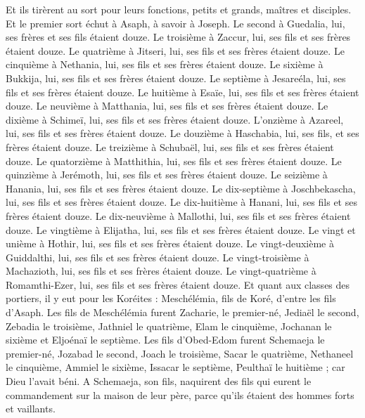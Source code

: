 \begin{multicols}{2}
Et ils tirèrent au sort pour leurs fonctions, petits et grands, maîtres et disciples.
Et le premier sort échut à Asaph, à savoir à Joseph. Le second à Guedalia, lui, ses frères et ses fils étaient douze.
Le troisième à Zaccur, lui, ses fils et ses frères étaient douze.
Le quatrième à Jitseri, lui, ses fils et ses frères étaient douze.
Le cinquième à Nethania, lui, ses fils et ses frères étaient douze.
Le sixième à Bukkija, lui, ses fils et ses frères étaient douze.
Le septième à Jesareéla, lui, ses fils et ses frères étaient douze.
Le huitième à Esaïe, lui, ses fils et ses frères étaient douze.
Le neuvième à Matthania, lui, ses fils et ses frères étaient douze.
Le dixième à Schimeï, lui, ses fils et ses frères étaient douze.
L'onzième à Azareel, lui, ses fils et ses frères étaient douze.
Le douzième à Haschabia, lui, ses fils, et ses frères étaient douze.
Le treizième à Schubaël, lui, ses fils et ses frères étaient douze.
Le quatorzième à Matthithia, lui, ses fils et ses frères étaient douze.
Le quinzième à Jerémoth, lui, ses fils et ses frères étaient douze.
Le seizième à Hanania, lui, ses fils et ses frères étaient douze.
Le dix-septième à Joschbekascha, lui, ses fils et ses frères étaient douze.
Le dix-huitième à Hanani, lui, ses fils et ses frères étaient douze.
Le dix-neuvième à Mallothi, lui, ses fils et ses frères étaient douze.
Le vingtième à Elijatha, lui, ses fils et ses frères étaient douze.
Le vingt et unième à Hothir, lui, ses fils et ses frères étaient douze.
Le vingt-deuxième à Guiddalthi, lui, ses fils et ses frères étaient douze.
Le vingt-troisième à Machazioth, lui, ses fils et ses frères étaient douze.
Le vingt-quatrième à Romamthi-Ezer, lui, ses fils et ses frères étaient douze.
\VerseOne{}Et quant aux classes des portiers, il y eut pour les Koréites : Meschélémia, fils de Koré, d'entre les fils d'Asaph.
Les fils de Meschélémia furent Zacharie, le premier-né, Jediaël le second, Zebadia le troisième, Jathniel le quatrième,
Elam le cinquième, Jochanan le sixième et Eljoénaï le septième.
Les fils d’Obed-Edom furent Schemaeja le premier-né, Jozabad le second, Joach le troisième, Sacar le quatrième, Nethaneel le cinquième,
Ammiel le sixième, Issacar le septième, Peulthaï le huitième ; car Dieu l'avait béni.
A Schemaeja, son fils, naquirent des fils qui eurent le commandement sur la maison de leur père, parce qu'ils étaient des hommes forts et vaillants.

\end{multicols}
